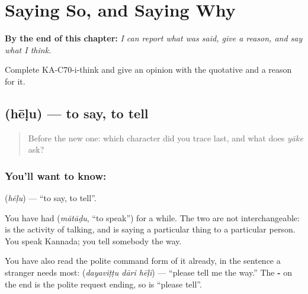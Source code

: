 
\chapter{Saying So, and Saying Why}
\label{ch:ka-saying-why}

\begin{chapteropening}
\textbf{By the end of this chapter:} \emph{I can report what was said, give a reason, and say what I think.}

Complete KA-C70-i-think and give an opinion with the quotative and a reason for it.
\end{chapteropening}

\section[\texorpdfstring{\kn{ಹೇಳು} (hēḷu)}{ಹೇಳು (hēḷu)}]{ (hēḷu) — to say, to tell}

\label{lesson:KA-C70-say}



\begin{quote}
Before the new one: which character did you trace last, and what does \emph{yāke} ask?
\end{quote}

\subsection*{You'll want to know: }
\textbf{} (\emph{hēḷu}) — \textquotedblleft{}to say, to tell\textquotedblright{}.

You have had  (\emph{mātāḍu}, \textquotedblleft{}to speak\textquotedblright{}) for a while. The two are not interchangeable:  is the activity of talking, and  is saying a particular thing to a particular person. You speak Kannada; you tell somebody the way.

You have also read the polite command form of it already, in the sentence a stranger needs most: \textbf{  } (\emph{dayaviṭṭu dāri hēḷi}) — \textquotedblleft{}please tell me the way.\textquotedblright{} The \textbf{-} on the end is the polite request ending, so  is \textquotedblleft{}please tell\textquotedblright{}.

